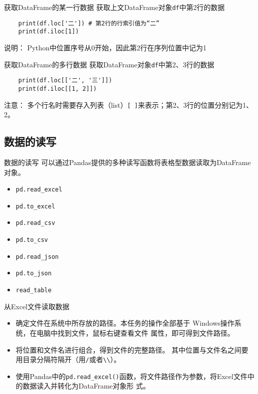 \documentclass[t]{beamer}
\begin{document}
\begin{frame}[fragile]{获取DataFrame的某一行数据}
    获取上文DataFrame对象\verb|df|中第2行的数据
\begin{lstlisting}
    print(df.loc['二']) # 第2行的行索引值为“二”
    print(df.iloc[1])
\end{lstlisting}

\begin{block}{说明：}
    Python中位置序号从0开始，因此第2行在序列位置中记为1
\end{block}
\end{frame}


\begin{frame}[fragile]{获取DataFrame的多行数据}
    获取DataFrame对象\verb|df|中第2、3行的数据
\begin{lstlisting}
    print(df.loc[['二', '三']]) 
    print(df.iloc[[1, 2]])
\end{lstlisting}

\begin{block}{注意：}
多个行名时需要存入列表（list）\verb|[ ]|来表示；第2、3行的位置分别记为1、2。
\end{block}
\end{frame}


\subsection{数据的读写}
\begin{frame}[fragile]{数据的读写}
可以通过Pandas提供的多种读写函数将表格型数据读取为DataFrame对象。
\begin{multicols*}{2}
    \begin{itemize} 
    \item \verb|pd.read_excel|
    \item \verb|pd.to_excel|
    \item \verb|pd.read_csv|
    \item \verb|pd.to_csv|
    \item \verb|pd.read_json|
    \item \verb|pd.to_json|
    \item \verb|read_table|
\end{itemize}
\end{multicols*}

\end{frame}


\begin{frame}[fragile]{从Excel文件读取数据}
\begin{itemize}
    \item 确定文件在系统中所存放的路径。本任务的操作全部基于
    Windows操作系统，在电脑中找到文件，鼠标右键查看文件
    属性，即可得到文件路径。
    \item 将位置和文件名进行组合，得到文件的完整路径。
    其中位置与文件名之间要用目录分隔符隔开（用\verb|/|或者\verb|\\|）。
    \item 使用Pandas中的\verb|pd.read_excel()|函数，将文件路径作为参数，将Excel文件中的数据读入并转化为DataFrame对象形
    式。
\end{itemize}
\end{frame}
\end{document}
